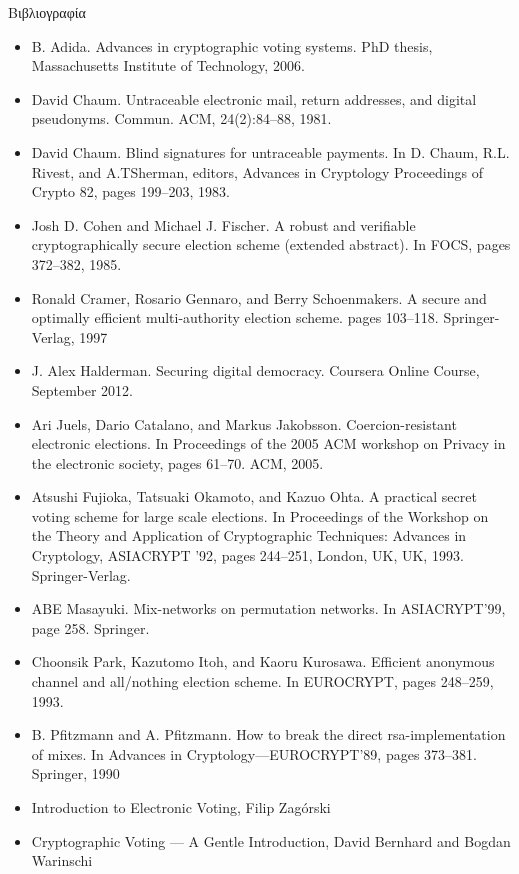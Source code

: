 \documentclass[handout]{beamer}
\begin{document}
\begin{frame}[allowframebreaks]{Βιβλιογραφία}
\begin{tiny}
\begin{itemize}
 \item B. Adida. Advances in cryptographic voting systems. PhD thesis, Massachusetts Institute of Technology, 2006.
 \item David Chaum. Untraceable electronic mail, return addresses, and digital pseudonyms. Commun. ACM, 24(2):84--88, 1981.
 \item David Chaum. Blind signatures for untraceable payments. In D. Chaum, R.L. Rivest, and A.TSherman, editors, Advances in Cryptology Proceedings of Crypto 82, pages 199--203, 1983.
 \item Josh D. Cohen and Michael J. Fischer. A robust and verifiable cryptographically secure election scheme (extended abstract). In FOCS, pages 372--382, 1985.
 \item Ronald Cramer, Rosario Gennaro, and Berry Schoenmakers. A secure and optimally efficient multi-authority election scheme. pages 103--118. Springer-Verlag, 1997
 \item J. Alex Halderman. Securing digital democracy. Coursera Online Course, September 2012.
 \item Ari Juels, Dario Catalano, and Markus Jakobsson. Coercion-resistant electronic elections. In Proceedings of the 2005 ACM workshop on Privacy in the electronic society, pages 61--70.
ACM, 2005. 
 \item Atsushi Fujioka, Tatsuaki Okamoto, and Kazuo Ohta. A practical secret voting scheme for large
scale elections. In Proceedings of the Workshop on the Theory and Application of Cryptographic
Techniques: Advances in Cryptology, ASIACRYPT '92, pages 244--251, London, UK, UK,
1993. Springer-Verlag.
 \item ABE Masayuki. Mix-networks on permutation networks. In ASIACRYPT’99, page 258. Springer.
 \item Choonsik Park, Kazutomo Itoh, and Kaoru Kurosawa. Efficient anonymous channel and all/nothing election scheme. In EUROCRYPT, pages 248--259, 1993.
  \item B. Pfitzmann and A. Pfitzmann. How to break the direct rsa-implementation of mixes. In Advances in Cryptology—EUROCRYPT’89, pages 373--381. Springer, 1990
  \item Introduction to Electronic Voting, Filip Zagórski
  \item Cryptographic Voting — A Gentle Introduction,  David Bernhard and Bogdan Warinschi
\end{itemize} 
\end{tiny}
\end{frame}
\end{document}
